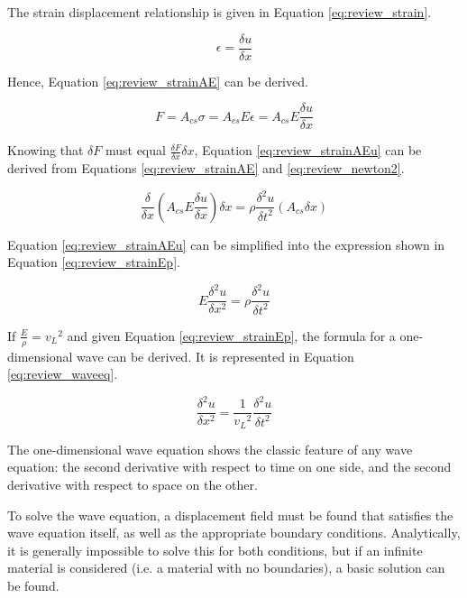 The strain displacement relationship is given in Equation \ref{eq:review_strain}.

\begin{equation} \label{eq:review_strain}
\epsilon = \frac{\delta u}{\delta x}
 \end{equation}

Hence, Equation \ref{eq:review_strainAE} can be derived.

\begin{equation} \label{eq:review_strainAE}
F = A_{cs} \sigma = A_{cs} E \epsilon = A_{cs} E \frac{\delta u}{\delta x}
 \end{equation}

Knowing that $\delta F$ must equal $\frac{\delta F}{\delta x} \delta x$, Equation \ref{eq:review_strainAEu} can be derived from Equations \ref{eq:review_strainAE} and \ref{eq:review_newton2}.

\begin{equation} \label{eq:review_strainAEu}
\frac{\delta}{\delta x} ( A_{cs} E \frac{\delta u}{\delta x} ) \delta x = \rho \frac{\delta^2 u}{\delta t^2} (A_{cs} \delta x)
 \end{equation}

Equation \ref{eq:review_strainAEu} can be simplified into the expression shown in Equation \ref{eq:review_strainEp}.

\begin{equation} \label{eq:review_strainEp}
E \frac{\delta^2 u}{\delta x^2} = \rho \frac{\delta^2 u}{\delta t^2}
 \end{equation}

If $\frac{E}{\rho} = {v_L}^2$ and given Equation \ref{eq:review_strainEp}, the formula for a one-dimensional wave can be derived. It is represented in Equation \ref{eq:review_waveeq}.

\begin{equation} \label{eq:review_waveeq}
\frac{\delta^2 u}{\delta x^2} = \frac{1}{{v_L}^2} \frac{\delta^2 u}{\delta t^2}
 \end{equation}

The one-dimensional wave equation shows the classic feature of any wave equation: the second derivative with respect to time on one side, and the second derivative with respect to space on the other\cite{graff_wave_2012,royer_elastic_2000}.

To solve the wave equation, a displacement field must be found that satisfies the wave equation itself, as well as the appropriate boundary conditions. Analytically, it is generally impossible to solve this for both conditions, but if an infinite material is considered (i.e. a material with no boundaries), a basic solution can be found.


